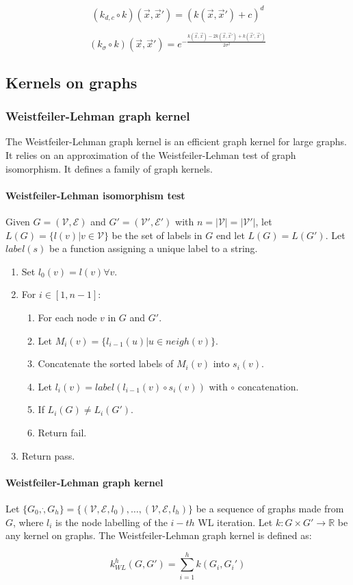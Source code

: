 		$$(k_{d,c}\circ k)(\vec{x},\vec{x}') = (k(\vec{x},\vec{x}')+c)^d$$

		$$(k_\sigma\circ k)(\vec{x},\vec{x}') = e^{-\frac{k(\vec{x},\vec{x})-2k(\vec{x},\vec{x}')+k(\vec{x}',\vec{x}')}{2\sigma^2}}$$

	\subsection{Kernels on graphs}

		\subsubsection{Weistfeiler-Lehman graph kernel}
		The Weistfeiler-Lehman graph kernel is an efficient graph kernel for large graphs.
		It relies on an approximation of the Weistfeiler-Lehman test of graph isomorphism.
		It defines a family of graph kernels.

			\paragraph{Weistfeiler-Lehman isomorphism test}
			Given $G=(\mathcal{V},\mathcal{E})$ and $G'=(\mathcal{V}',\mathcal{E}')$ with $n=|\mathcal{V}|=|\mathcal{V}'|$, let $L(G) = \{l(v)|v\in\mathcal{V}\}$ be the set of labels in $G$ end let $L(G) =L(G')$.
			Let $label(s)$ be a function assigning a unique label to a string.

			\begin{enumerate}
				\item Set $l_0(v) = l(v)\forall v$.
				\item For $i\in[1,n-1]$:
					\begin{enumerate}
						\item For each node $v$ in $G$ and $G'$.
						\item Let $M_i(v) = \{l_{i-1}(u)|u\in neigh(v)\}$.
						\item Concatenate the sorted labels of $M_i(v)$ into $s_i(v)$.
						\item Let $l_i(v) = label(l_{i-1}(v)\circ s_i(v))$ with $\circ$ concatenation.
						\item If $L_i(G)\neq L_i(G')$.
						\item Return fail.
					\end{enumerate}
				\item Return pass.
			\end{enumerate}

			\paragraph{Weistfeiler-Lehman graph kernel}
			Let $\{G_0,\dot,G_h\} = \{(\mathcal{V},\mathcal{E},l_0),\dots, (\mathcal{V},\mathcal{E},l_h)\}$ be a sequence of graphs made from $G$, where $l_i$ is the node labelling of the $i-th$ WL iteration.
			Let $k:G\times G'\rightarrow\mathbb{R}$ be any kernel on graphs.
			The Weistfeiler-Lehman graph kernel is defined as:

			$$k_{WL}^h(G,G') = \sum\limits_{i=1}^hk(G_i,G_i')$$
